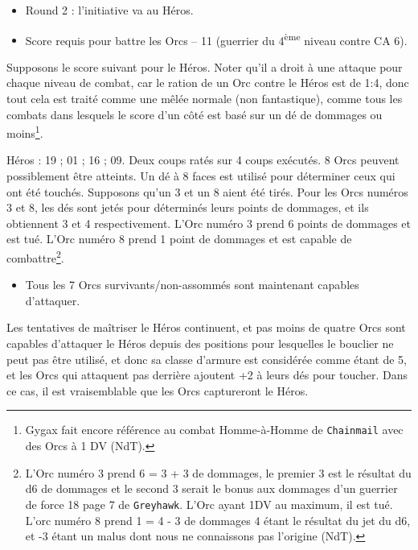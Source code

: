 \medskip

\begin{itemize}
\item Round 2 : l'initiative va au Héros.
\item Score requis pour battre les Orcs -- 11 (guerrier du 4\textsuperscript{ème} niveau contre CA 6).
\end{itemize}

\medskip

Supposons le score suivant pour le Héros. Noter qu'il a droit à une attaque pour chaque niveau de combat, car le ration de un Orc contre le Héros est de \foreignlanguage{english}{1:4}, donc tout cela est traité comme une mêlée normale (non fantastique), comme tous les combats dans lesquels le score d'un côté est basé sur un dé de dommages ou moins\footnote{
    Gygax fait encore référence au combat Homme-à-Homme de \texttt{Chainmail} avec des Orcs à 1 DV (NdT).
}.

\medskip

Héros : 19 ; 01 ; 16 ; 09. Deux coups ratés sur 4 coups exécutés. 8 Orcs peuvent possiblement être atteints. Un dé à 8 faces est utilisé pour déterminer ceux qui ont été touchés. Supposons qu'un 3 et un 8 aient été tirés. Pour les Orcs numéros 3 et 8, les dés sont jetés pour déterminés leurs points de dommages, et ils obtiennent 3 et 4 respectivement. L'Orc numéro 3 prend 6 points de dommages et est tué. L'Orc numéro 8 prend 1 point de dommages et est capable de combattre\footnote{
    L'Orc numéro 3 prend 6 = 3 + 3 de dommages, le premier 3 est le résultat du d6 de dommages et le second 3 serait le bonus aux dommages d'un guerrier de force 18 page 7 de \texttt{Greyhawk}. L'Orc ayant 1DV au maximum, il est tué. L'orc numéro 8 prend 1 = 4 - 3 de dommages 4 étant le résultat du jet du d6, et -3 étant un malus dont nous ne connaissons pas l'origine (NdT).
}.

\medskip

\begin{itemize}
\item Tous les 7 Orcs survivants/non-assommés sont maintenant capables d'attaquer.
\end{itemize}

\medskip

Les tentatives de maîtriser le Héros continuent, et pas moins de quatre Orcs sont capables d'attaquer le Héros depuis des positions pour lesquelles le bouclier ne peut pas être utilisé, et donc sa classe d'armure est considérée comme étant de 5, et les Orcs qui attaquent pas derrière ajoutent +2 à leurs dés pour toucher. Dans ce cas, il est vraisemblable que les Orcs captureront le Héros.

